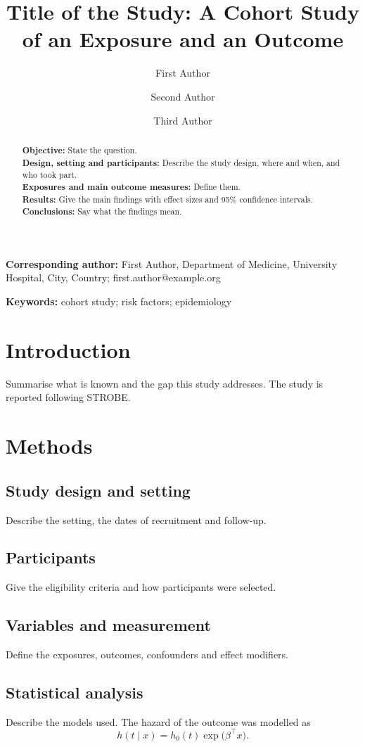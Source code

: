 \documentclass[11pt,a4paper]{article}
\title{Title of the Study: A Cohort Study of an Exposure and an Outcome}
\author[1]{First Author}
\author[1,2]{Second Author}
\author[2]{Third Author}
\affil[1]{Department of Medicine, University Hospital, City, Country}
\affil[2]{School of Public Health, University, City, Country}
\date{}
\begin{document}
\maketitle

\noindent\textbf{Corresponding author:} First Author, Department of Medicine,
University Hospital, City, Country; first.author@example.org

\begin{abstract}
\noindent\textbf{Objective:} State the question.\\
\textbf{Design, setting and participants:} Describe the study design, where and when, and who took part.\\
\textbf{Exposures and main outcome measures:} Define them.\\
\textbf{Results:} Give the main findings with effect sizes and 95\% confidence intervals.\\
\textbf{Conclusions:} Say what the findings mean.
\end{abstract}

\noindent\textbf{Keywords:} cohort study; risk factors; epidemiology

\section{Introduction}
Summarise what is known and the gap this study addresses. The study is reported
following STROBE.\cite{vonelm2007strobe}

\section{Methods}
\subsection{Study design and setting}
Describe the setting, the dates of recruitment and follow-up.

\subsection{Participants}
Give the eligibility criteria and how participants were selected.

\subsection{Variables and measurement}
Define the exposures, outcomes, confounders and effect modifiers.

\subsection{Statistical analysis}
Describe the models used. The hazard of the outcome was modelled as
\begin{equation}
  h(t \mid x) = h_0(t) \exp\bigl(\beta^\top x\bigr).
\end{equation}
\end{document}
